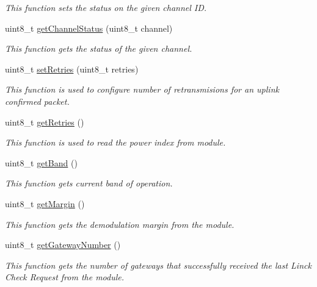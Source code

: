 \begin{DoxyCompactItemize}
\begin{DoxyCompactList}\small\item\em This function sets the status on the given channel ID. \end{DoxyCompactList}\item 
uint8\+\_\+t \hyperlink{class_wasp_lo_ra_w_a_n_aead9cee2fd6d03f6c25118ca3ff190de}{get\+Channel\+Status} (uint8\+\_\+t channel)
\begin{DoxyCompactList}\small\item\em This function gets the status of the given channel. \end{DoxyCompactList}\item 
uint8\+\_\+t \hyperlink{class_wasp_lo_ra_w_a_n_a7a5d0579fa9c58b4690a0e891faf4b56}{set\+Retries} (uint8\+\_\+t retries)
\begin{DoxyCompactList}\small\item\em This function is used to configure number of retransmisions for an uplink confirmed packet. \end{DoxyCompactList}\item 
uint8\+\_\+t \hyperlink{class_wasp_lo_ra_w_a_n_a64854a7e37fd60414afe00f67577298b}{get\+Retries} ()
\begin{DoxyCompactList}\small\item\em This function is used to read the power index from module. \end{DoxyCompactList}\item 
uint8\+\_\+t \hyperlink{class_wasp_lo_ra_w_a_n_a8fa6460dfeed04e88f2d55bb1b45a891}{get\+Band} ()
\begin{DoxyCompactList}\small\item\em This function gets current band of operation. \end{DoxyCompactList}\item 
uint8\+\_\+t \hyperlink{class_wasp_lo_ra_w_a_n_a0ea02db435640d7a7396b366ce87b52b}{get\+Margin} ()
\begin{DoxyCompactList}\small\item\em This function gets the demodulation margin from the module. \end{DoxyCompactList}\item 
uint8\+\_\+t \hyperlink{class_wasp_lo_ra_w_a_n_ae31d8f481714ac4ff05ae9a6b5e4316e}{get\+Gateway\+Number} ()
\begin{DoxyCompactList}\small\item\em This function gets the number of gateways that successfully received the last Linck Check Request from the module. \end{DoxyCompactList}\item 

\end{DoxyCompactItemize}
